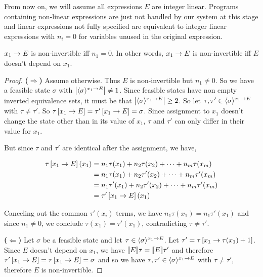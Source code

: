 From now on, we will assume all expressions $ E $ are integer
linear. Programs containing non-linear expressions are just not
handled by our system at this stage and linear expressions not fully
specified are equivalent to integer linear expressions with $ n_i = 0
$ for variables unused in the original expression.

\begin{lemma} \label{thm:pp:assign:zero} $ x_1 \rightarrow E $ is non-invertible iff $ n_1 = 0
$. In other words, $ x_1 \rightarrow E $ is non-invertible iff $ E $ doesn't depend on $
x_1 $.
\end{lemma}
\begin{proof}
\textbf{($ \Rightarrow $)}
Assume otherwise. Thus $ E $ is non-invertible but $ n_1 \neq 0 $. So
we have a feasible state $ \sigma $ with
$ \left| \langle \sigma \rangle^{x_1 \rightarrow E} \right| \neq 1 $. Since feasible states
have non empty inverted equivalence sets, it must be that
$ \left| \langle \sigma \rangle^{x_1 \rightarrow E} \right| \geq 2 $. So let
$ \tau, \tau' \in \langle \sigma \rangle^{x_1 \rightarrow E} $ with $ \tau \neq \tau'
$. So $ \tau \left[ x_1 \rightarrow E \right] = \tau' \left[ x_1 \rightarrow E \right] = \sigma
$. Since assignment to $ x_1 $ doesn't change the state other than in
its value of $ x_1 $, $ \tau $ and $ \tau' $ can only differ in their
value for $ x_1 $.

But since $ \tau $ and $ \tau' $ are identical after the assignment,
we have,

\begin{align*}
\tau \left[ x_1 \rightarrow E \right](x_1) & = n_1 \tau (x_1) + n_2 \tau
(x_2) + \cdots + n_m \tau(x_m) \\ & = n_1 \tau (x_1) + n_2 \tau' (x_2)
+ \cdots + n_m \tau' (x_m) \\
& = n_1 \tau' (x_1) + n_2 \tau' (x_2) + \cdots + n_m \tau' (x_m) \\
& = \tau' \left[ x_1 \rightarrow E \right](x_1) 
\end{align*}

Canceling out the common $ \tau'(x_i) $ terms, we have $
n_1 \tau(x_1) = n_1 \tau'(x_1) $ and since $ n_1 \neq 0 $, we conclude
$ \tau(x_1) = \tau'(x_1) $, contradicting $ \tau \neq \tau' $.

\textbf{($ \Leftarrow $)} Let $ \sigma $ be a feasible state and let
$ \tau \in \langle \sigma \rangle^{x_1 \rightarrow E} $. Let $ \tau'
= \tau \left[ x_1 \rightarrow \tau(x_1) + 1 \right] $. Since $ E $ doesn't depend
on $ x_1 $, we have $ [\![{E}]\!]{\tau} = [\![{E}]\!]{\tau'} $ and
therefore $ \tau' \left[ x_1 \rightarrow E \right] = \tau \left[ x_1 \rightarrow E \right]
= \sigma $ and so we have $ \tau, \tau' \in \langle \sigma \rangle^{x_1 \rightarrow E}
$ with $ \tau \neq \tau' $, therefore $ E $ is non-invertible.
\end{proof}

